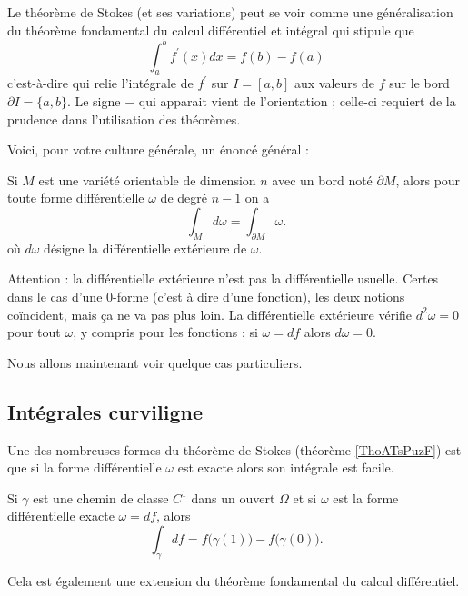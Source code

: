 Le théorème de Stokes (et ses variations) peut se voir comme une généralisation du théorème fondamental du calcul différentiel et intégral qui stipule que
\begin{equation*}
	\int_a^b f^\prime(x) d x = f(b) - f(a)
\end{equation*}
c'est-à-dire qui relie l'intégrale de $f^\prime$ sur $I = [a,b]$ aux valeurs de $f$ sur le bord $\partial I = \{a,b\}$. Le signe $-$ qui apparait vient de l'orientation ; celle-ci requiert de la prudence dans l'utilisation des théorèmes.

Voici, pour votre culture générale, un énoncé général :
\begin{theorem} \label{ThoATsPuzF}
	Si $M$ est une variété orientable de dimension $n$ avec un bord noté $\partial  M$, alors pour toute forme différentielle $\omega$ de degré $n-1$ on a 
	\begin{equation*}
		\int_{ M} d \omega = \int_{\partial  M} \omega.
	\end{equation*}
	où $d \omega$ désigne la différentielle extérieure de $\omega$.
\end{theorem}
Attention : la différentielle extérieure n'est pas la différentielle usuelle. Certes dans le cas d'une \( 0\)-forme (c'est à dire d'une fonction), les deux notions coïncident, mais ça ne va pas plus loin. La différentielle extérieure vérifie \( d^2\omega=0\) pour tout \( \omega\), y compris pour les fonctions : si \( \omega=df\) alors \( d\omega=0\).


Nous allons maintenant voir quelque cas particuliers. 

\subsection{Intégrales curviligne}

Une des nombreuses formes du théorème de Stokes (théorème \ref{ThoATsPuzF}) est que si la forme différentielle \( \omega\) est exacte alors son intégrale est facile.
\begin{theorem} \label{ThoUJMhFwU}
    Si \( \gamma\) est une chemin de classe \( C^1\) dans un ouvert \( \Omega\) et si \( \omega\) est la forme différentielle exacte \( \omega=df\), alors
    \begin{equation}
        \int_{\gamma}df=f\big( \gamma(1) \big)-f\big( \gamma(0) \big).
    \end{equation}
\end{theorem}
Cela est également une extension du théorème fondamental du calcul différentiel.


